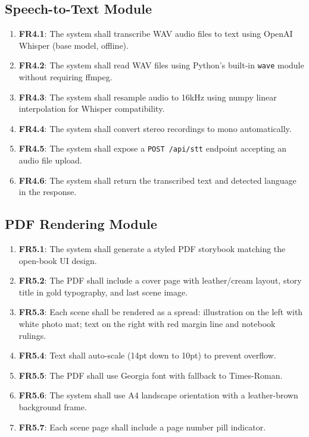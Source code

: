\subsection{Speech-to-Text Module}
\begin{enumerate}
    \item \textbf{FR4.1}: The system shall transcribe WAV audio files to text using OpenAI Whisper (base model, offline).
    \item \textbf{FR4.2}: The system shall read WAV files using Python's built-in \texttt{wave} module without requiring ffmpeg.
    \item \textbf{FR4.3}: The system shall resample audio to 16kHz using numpy linear interpolation for Whisper compatibility.
    \item \textbf{FR4.4}: The system shall convert stereo recordings to mono automatically.
    \item \textbf{FR4.5}: The system shall expose a \texttt{POST /api/stt} endpoint accepting an audio file upload.
    \item \textbf{FR4.6}: The system shall return the transcribed text and detected language in the response.
\end{enumerate}

\subsection{PDF Rendering Module}
\begin{enumerate}
    \item \textbf{FR5.1}: The system shall generate a styled PDF storybook matching the open-book UI design.
    \item \textbf{FR5.2}: The PDF shall include a cover page with leather/cream layout, story title in gold typography, and last scene image.
    \item \textbf{FR5.3}: Each scene shall be rendered as a spread: illustration on the left with white photo mat; text on the right with red margin line and notebook rulings.
    \item \textbf{FR5.4}: Text shall auto-scale (14pt down to 10pt) to prevent overflow.
    \item \textbf{FR5.5}: The PDF shall use Georgia font with fallback to Times-Roman.
    \item \textbf{FR5.6}: The system shall use A4 landscape orientation with a leather-brown background frame.
    \item \textbf{FR5.7}: Each scene page shall include a page number pill indicator.
\end{enumerate}

